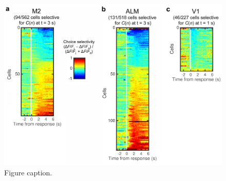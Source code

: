 \begin{figure}[htbp]

\begin{center}
\includegraphics[width=\textwidth]{Figures/NN_figS8.jpg} 
\end{center}

\caption[Choice selectivity of neurons in M2, ALM and V1.]
{Figure caption.}

\label{fig:NN_figS8}
\end{figure}